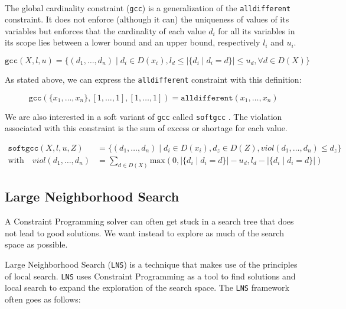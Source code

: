 \documentclass[../../thesis.tex]{subfiles}
\begin{document}
\paragraph{}


The global cardinality constraint (\texttt{gcc}) \cite{Regin:1996} is a generalization of the 
\texttt{alldifferent} constraint. It does not enforce (although it can) the uniqueness of values of its variables
but enforces that the cardinality of each value $d_i$ for all its variables in its scope lies
between a lower bound and an upper bound, respectively $l_i$ and $u_i$. 

\begin{equation*}
  \texttt{gcc}(X, l, u) = \{ (d_1, \dots, d_n) \mid d_i \in D(x_i), l_d \leq |\{ d_i \mid d_i = d \}| \leq u_d, \forall d \in D(X) \}
\end{equation*}

As stated above, we can express the \texttt{alldifferent} constraint with this definition:

\begin{equation*}
\texttt{gcc}(\{ x_1, \dots, x_n \}, [1, \dots, 1], [1, \dots, 1]) = \texttt{alldifferent}(x_1, \dots, x_n)
\end{equation*}


We are also interested in a soft variant of \texttt{gcc} called \texttt{softgcc} \cite{VanHoeve2006}. 
The violation associated with this constraint is the sum of excess or shortage \cite{schaus:softgcc} for each value.

\begin{align*}
  \texttt{softgcc}(X, l, u, Z) &= \{ (d_1, \dots, d_n) \mid d_i \in D(x_i), d_z \in D(Z), viol(d_1, \dots, d_n) \leq d_z \} \\
  \text{with} \quad viol(d_1, \dots, d_n) &= \sum_{d \in D(X)} \text{max}(0, |\{ d_i \mid d_i = d \}| - u_d, l_d - |\{ d_i \mid d_i = d \}|)
\end{align*}


\subsection{Large Neighborhood Search}

A Constraint Programming solver can often get stuck in a search tree that does not lead to good solutions.
We want instead to explore as much of the search space as possible. 

Large Neighborhood Search (\texttt{LNS}) is a technique that makes use of the principles of local search.
\texttt{LNS} uses Constraint Programming as a tool to find solutions and local search to expand the exploration of the search space. 
The \texttt{LNS} framework often goes as follows:
\end{document}
